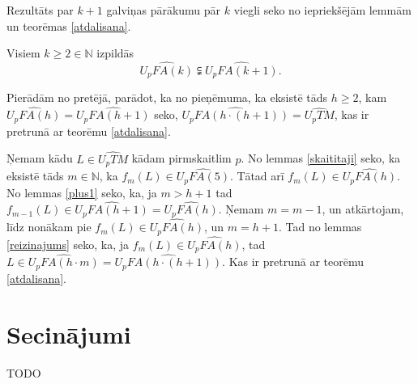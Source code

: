 \documentclass{ludis}
\begin{document}
Rezultāts par $k + 1$ galviņas pārākumu pār $k$ viegli seko no iepriekšējām lemmām un teorēmas \ref{atdalisana}.
\begin{teorema}
Visiem $k \geq 2 \in \mathbb{N}$ izpildās
\[
	\widehat{U_pFA(k)} \subsetneqq \widehat{U_pFA(k + 1)}.
\]
\end{teorema}
\begin{pieradijums}
Pierādām no pretējā, parādot, ka no pieņēmuma, ka eksistē tāds $h \geq 2$, kam $\widehat{U_pFA(h)} = \widehat{U_pFA(h + 1)}$ seko, $\widehat{U_pFA(h \cdot (h + 1))} = \widehat{U_pTM}$, kas ir pretrunā ar teorēmu \ref{atdalisana}.

Ņemam kādu $L \in \widehat{U_pTM}$ kādam pirmskaitlim $p$. No lemmas \ref{skaititaji} seko, ka eksistē tāds $m \in \mathbb{N}$, ka $f_m(L) \in \widehat{U_pFA(5)}$. Tātad arī $f_m(L) \in \widehat{U_pFA(h)}$. No lemmas \ref{plus1} seko, ka, ja $m > h + 1$ tad $f_{m-1}(L) \in \widehat{U_pFA(h + 1)} = \widehat{U_pFA(h)}$. Ņemam $m = m - 1$, un atkārtojam, līdz nonākam pie $f_m(L) \in \widehat{U_pFA(h)}$, un $m = h + 1$. Tad no lemmas \ref{reizinajums} seko, ka, ja $f_m(L) \in \widehat{U_pFA(h)}$, tad $L \in \widehat{U_pFA(h \cdot m)} = \widehat{U_pFA(h \cdot (h + 1))}$. Kas ir pretrunā ar teorēmu \ref{atdalisana}.
\end{pieradijums}

\chapter{Secinājumi}
TODO

\printbibliography
\end{document}
